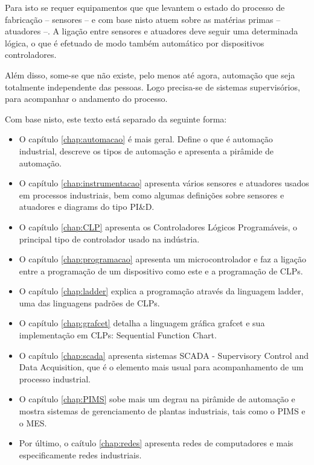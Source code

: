 Para isto se requer equipamentos que que levantem o estado do processo de fabricação -- sensores -- e com base nisto atuem sobre as matérias primas -- atuadores --. A ligação entre sensores e atuadores deve seguir uma determinada lógica, o que é efetuado de modo também automático por dispositivos controladores.

Além disso, some-se que não existe, pelo menos até agora, automação que seja totalmente independente das pessoas. Logo precisa-se de sistemas supervisórios, para acompanhar o andamento do processo.

Com base nisto, este texto está separado da seguinte forma:
\begin{itemize}
    \item O capítulo \ref{chap:automacao} é mais geral. Define o que é automação industrial, descreve os tipos de automação e apresenta a pirâmide de automação.
    \item O capítulo \ref{chap:instrumentacao} apresenta vários sensores e atuadores usados em processos industriais, bem como algumas definições sobre sensores e atuadores e diagrams do tipo PI\&D.
    \item O capítulo \ref{chap:CLP} apresenta os Controladores Lógicos Programáveis, o principal tipo de controlador usado na indústria.
    \item O capítulo \ref{chap:programacao} apresenta um microcontrolador e faz a ligação entre a programação de um dispositivo como este e a programação de CLPs.
    \item O capítulo \ref{chap:ladder} explica a programação através da linguagem ladder, uma das linguagens padrões de CLPs.
    \item O capítulo \ref{chap:grafcet} detalha a linguagem gráfica grafcet e sua implementação em CLPs: Sequential Function Chart.
    \item O capítulo \ref{chap:scada} apresenta sistemas SCADA - Supervisory Control and Data Acquisition, que é o elemento mais usual para acompanhamento de um processo industrial.
    \item O capítulo \ref{chap:PIMS} sobe mais um degrau na pirâmide de automação e mostra sistemas de gerenciamento de plantas industriais, tais como o PIMS e o MES.
    \item Por último, o caítulo \ref{chap:redes} apresenta redes de computadores e mais especificamente redes industriais.
\end{itemize}
